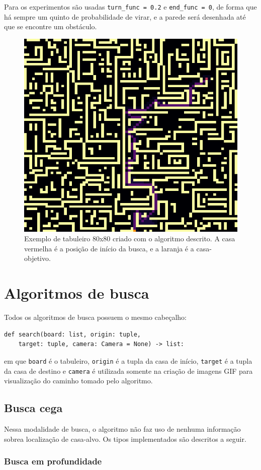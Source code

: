 \documentclass[12pt]{article}
\begin{document}
Para os experimentos são usadas \verb|turn_func = 0.2| e \verb|end_func = 0|, de forma que há sempre um quinto de probabilidade de virar, e a parede será desenhada até que se encontre um obstáculo.

\begin{figure}[h!]
	\centering
	\label{fig:trapezoidal}
	\includegraphics[width=.7\textwidth]{80x80}
	\caption{Exemplo de tabuleiro 80x80 criado com o algoritmo descrito. A casa vermelha é a posição de início da busca, e a laranja é a casa-objetivo.}
\end{figure}


\section{Algoritmos de busca}
Todos os algoritmos de busca possuem o mesmo cabeçalho:

\begin{lstlisting}
def search(board: list, origin: tuple,
	target: tuple, camera: Camera = None) -> list:
\end{lstlisting}

em que \verb|board| é o tabuleiro, \verb|origin| é a tupla da casa de início, \verb|target| é a tupla da casa de destino e \verb|camera| é utilizada somente na criação de imagens GIF para visualização do caminho tomado pelo algoritmo.

\subsection{Busca cega}
Nessa modalidade de busca, o algoritmo não faz uso de nenhuma informação sobrea localização de casa-alvo. Os tipos implementados são descritos a seguir.
\subsubsection{Busca em profundidade}
\end{document}
